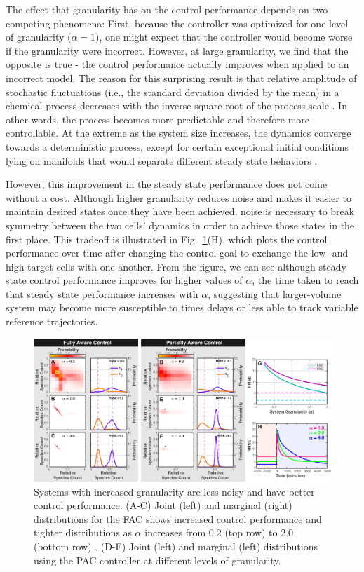 \documentclass[12pt]{iopart}
\begin{document}
The effect that granularity has on the control performance depends on two competing phenomena: First, because the controller was optimized for one level of granularity ($\alpha = 1$), one might expect that the controller would become worse if the granularity were incorrect. However, at large granularity, we find that the opposite is true - the control performance actually improves when applied to an incorrect model. The reason for this surprising result is that relative amplitude of stochastic fluctuations (i.e., the standard deviation divided by the mean) in a chemical process decreases with the inverse square root of the process scale \cite{VanKampen1992}. In other words, the process becomes more predictable and therefore more controllable. At the extreme as the system size increases, the dynamics converge towards a deterministic process, except for certain exceptional initial conditions lying on manifolds that would separate different steady state behaviors \cite{Strasser2012}. 

However, this improvement in the steady state performance does not come without a cost. Although higher granularity reduces noise and makes it easier to maintain desired states once they have been achieved, noise is necessary to break symmetry between the two cells' dynamics in order to achieve those states in the first place. This tradeoff is illustrated in Fig.\ \ref{Volume}(H), which plots the control performance over time after changing the control goal to exchange the low- and high-target cells with one another.  From the figure, we can see although steady state control performance improves for higher values of $\alpha$, the time taken to reach that steady state performance  increases with $\alpha$, suggesting that larger-volume system may become more susceptible to times delays or less able to track variable reference trajectories.

\begin{figure}[t!]
\begin{center}
\includegraphics[width=1\textwidth]{Granularity.pdf}
\vspace{-0.1in}
\caption{Systems with increased granularity are less noisy and have better control performance. (A-C) Joint (left) and marginal (right) distributions for the FAC shows increased control performance and tighter distributions as $\alpha$ increases from 0.2 (top row) to 2.0 (bottom row) . (D-F) Joint (left) and marginal (left) distributions using the PAC controller at different levels of granularity.}
\label{Volume}
\end{center}
\vspace{-0.2in}
\end{figure}
\end{document}
